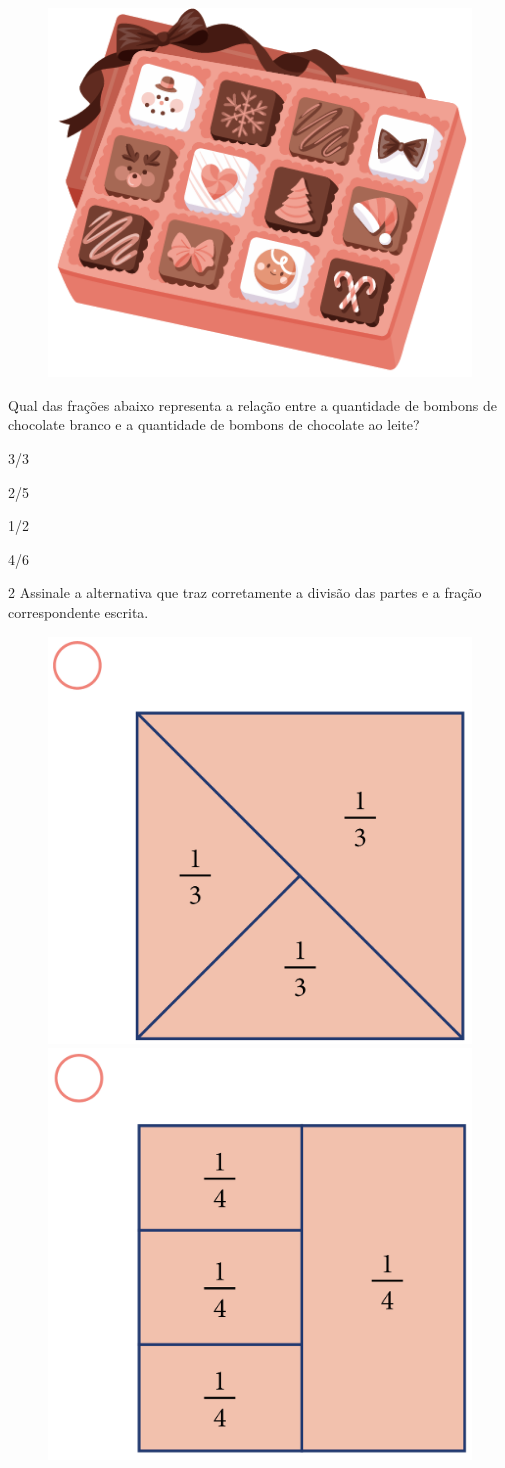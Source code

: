\begin{figure}[htpb!]
\centering
\includegraphics[width=.75\textwidth]{../ilustracoes/MAT5/SAEB_5ANO_MAT_figura76.png}
\end{figure}

Qual das frações abaixo representa a relação entre a quantidade de
bombons de chocolate branco e a quantidade de bombons de chocolate ao leite?

\begin{minipage}{.5\textwidth}
\begin{escolha}
\item
  3/3
\item
  2/5
\item
  1/2
\item
  4/6
\end{escolha}
\end{minipage}


\pagebreak

\num{2} Assinale a alternativa que traz corretamente a divisão das partes e a fração correspondente escrita.

\begin{figure}[htpb!]
\includegraphics[width=.35\textwidth]{../ilustracoes/MAT5/SAEB_5ANO_MAT_figura77-1.png}
\includegraphics[width=.35\textwidth]{../ilustracoes/MAT5/SAEB_5ANO_MAT_figura77-2.png}
\end{figure}

